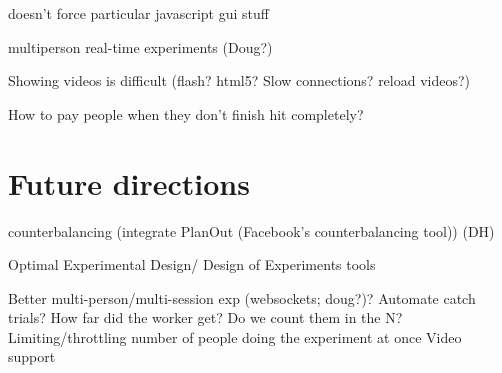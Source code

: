 \documentclass[jou,apacite]{apa6}
\begin{document}
doesn't force particular javascript gui stuff

multiperson real-time experiments (Doug?) 

Showing videos is difficult (flash? html5? Slow connections? reload videos?)

How to pay people when they don't finish hit completely?


\section{Future directions}

counterbalancing (integrate PlanOut (Facebook's counterbalancing tool)) (DH)

Optimal Experimental Design/ Design of Experiments tools

Better multi-person/multi-session exp (websockets; doug?)?
Automate catch trials? How far did the worker get? Do we count them in the N? 
Limiting/throttling number of people doing the experiment at once
Video support


\end{document}
